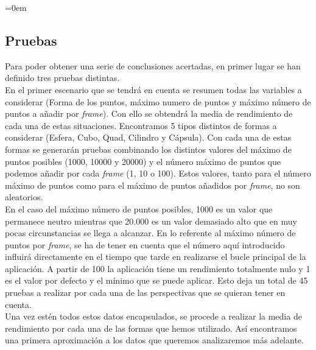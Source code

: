 \parindent=0em
\subsection{Pruebas}
\noindent

Para poder obtener una serie de conclusiones acertadas, en primer lugar se han definido tres pruebas distintas. \\

En el primer escenario que se tendrá en cuenta se resumen todas las variables a considerar (Forma de los puntos, máximo numero de puntos y máximo número de puntos a añadir por \textit{frame}). Con ello se obtendrá la media de rendimiento de cada una de estas situaciones. Encontramos 5 tipos distintos de formas a considerar (Esfera, Cubo, Quad, Cilindro y Cápsula). Con cada una de estas formas se generarán pruebas combinando los distintos valores del máximo de puntos posibles (1000, 10000 y 20000) y el número máximo de puntos que podemos añadir por cada \textit{frame} (1, 10 o 100). Estos valores, tanto para el número máximo de puntos como para el máximo de puntos añadidos por \textit{frame}, no son aleatorios. \\

En el caso del máximo número de puntos posibles, 1000 es un valor que permanece neutro mientras que 20.000 es un valor demasiado alto que en muy pocas circunstancias se llega a alcanzar. En lo referente al máximo número de puntos por \textit{frame}, se ha de tener en cuenta que el número aquí introducido influirá directamente en el tiempo que tarde en realizarse el bucle principal de la aplicación. A partir de 100 la aplicación tiene un rendimiento totalmente nulo y 1 es el valor por defecto y el mínimo que se puede aplicar. Esto deja un total de 45 pruebas a realizar por cada una de las perspectivas que se quieran tener en cuenta.\\

Una vez estén todos estos datos encapsulados, se procede a realizar la media de rendimiento por cada una de las formas que hemos utilizado. Así encontramos una primera aproximación a los datos que queremos analizaremos más adelante.\\

\begin{table}[ht]
\centering
{}
\caption{Media de \textit{Frames} Por Segundo (FPS) para cada una de las formas disponibles a la hora de realizar la oclusión. }
\label{cuadro:mediaRendimiento}
\end{table}

